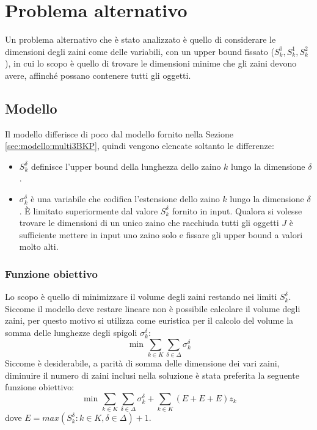 \section{Problema alternativo}
\label{sec:extension2}
Un problema alternativo che è  stato analizzato è quello di considerare le 
dimensioni degli zaini come delle variabili, con un upper bound fissato 
($S_k^0, S_k^1, S_k^2$), in cui lo scopo è quello di trovare le dimensioni 
minime che gli zaini devono avere, affinché possano contenere tutti gli oggetti.

\subsection{Modello}
\label{sec:modello:hull}
Il modello differisce di poco dal modello fornito nella
Sezione \ref{sec:modello:multi3BKP}, quindi vengono elencate soltanto le 
differenze:
\begin{itemize}
	\item $S_k^\delta$ definisce l'upper bound della lunghezza dello zaino $k$ 
	lungo la dimensione $\delta$.
	
	\item $\sigma_k^\delta$ è una variabile che codifica l'estensione dello 
	zaino $k$ lungo la dimensione $\delta$. È limitato superiormente dal valore
	$S_k^\delta$ fornito in input.
	Qualora si volesse trovare le dimensioni di un unico zaino che racchiuda 
	tutti gli oggetti $J$ è sufficiente	mettere in input uno zaino solo e 
	fissare gli upper bound a valori molto alti. 
	
\end{itemize}
\subsubsection{Funzione obiettivo}
Lo scopo è quello di minimizzare il volume degli zaini restando nei limiti 
$S_k^\delta$. Siccome il modello deve restare lineare non è possibile calcolare
il volume degli zaini, per questo motivo si utilizza come euristica per il 
calcolo del volume la somma delle lunghezze degli spigoli $\sigma_k^\delta$:
\begin{equation}
\text{ min } \sum_{k \in K} \sum_{\delta \in \Delta} \sigma_k^\delta
\end{equation}
Siccome è desiderabile, a parità di somma delle dimensione dei vari zaini,
diminuire il numero di zaini inclusi nella soluzione è stata preferita la 
seguente funzione obiettivo:
\begin{equation}
\text{ min } \sum_{k \in K} \sum_{\delta \in \Delta} \sigma_k^\delta 
+ \sum_{k \in K} (E + E + E) z_k
\end{equation}
dove $E = max(S_k^\delta : k \in K, \delta \in \Delta) + 1$.

